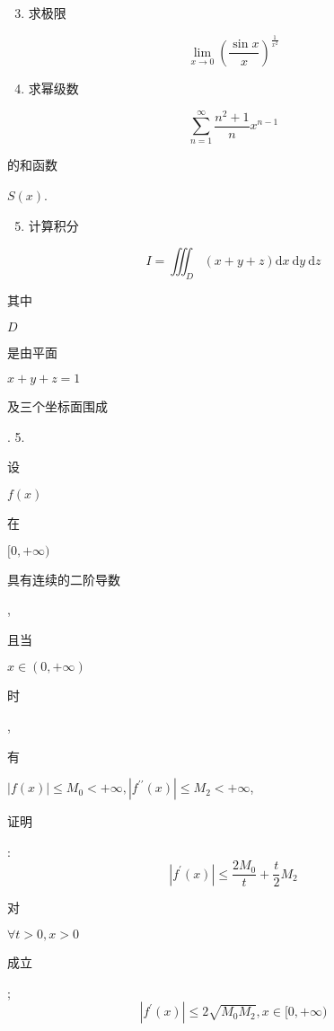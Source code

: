 \documentclass[10pt]{article}
\begin{document}
\begin{enumerate}
  \setcounter{enumi}{2}
  \item \begin{CJK}{UTF8}{mj}求极限\end{CJK}
\end{enumerate}
$$
\lim _{x \rightarrow 0}\left(\frac{\sin x}{x}\right)^{\frac{1}{x^{2}}}
$$

\begin{enumerate}
  \setcounter{enumi}{3}
  \item \begin{CJK}{UTF8}{mj}求幂级数\end{CJK}
\end{enumerate}
$$
\sum_{n=1}^{\infty} \frac{n^{2}+1}{n} x^{n-1}
$$
\begin{CJK}{UTF8}{mj}的和函数\end{CJK} $S(x)$.

\begin{enumerate}
  \setcounter{enumi}{4}
  \item \begin{CJK}{UTF8}{mj}计算积分\end{CJK}
\end{enumerate}
$$
I=\iiint_{D}(x+y+z) \mathrm{d} x \mathrm{~d} y \mathrm{~d} z
$$
\begin{CJK}{UTF8}{mj}其中\end{CJK} $D$ \begin{CJK}{UTF8}{mj}是由平面\end{CJK} $x+y+z=1$ \begin{CJK}{UTF8}{mj}及三个坐标面围成\end{CJK}. 5. \begin{CJK}{UTF8}{mj}设\end{CJK} $f(x)$ \begin{CJK}{UTF8}{mj}在\end{CJK} $[0,+\infty)$ \begin{CJK}{UTF8}{mj}具有连续的二阶导数\end{CJK}, \begin{CJK}{UTF8}{mj}且当\end{CJK} $x \in(0,+\infty)$ \begin{CJK}{UTF8}{mj}时\end{CJK}, \begin{CJK}{UTF8}{mj}有\end{CJK} $|f(x)| \leq M_{0}<+\infty,\left|f^{\prime \prime}(x)\right| \leq M_{2}<+\infty$, \begin{CJK}{UTF8}{mj}证明\end{CJK}:
$$
\left|f^{\prime}(x)\right| \leq \frac{2 M_{0}}{t}+\frac{t}{2} M_{2}
$$
\begin{CJK}{UTF8}{mj}对\end{CJK} $\forall t>0, x>0$ \begin{CJK}{UTF8}{mj}成立\end{CJK};
$$
\left|f^{\prime}(x)\right| \leq 2 \sqrt{M_{0} M_{2}}, x \in[0,+\infty)
$$
\end{document}
